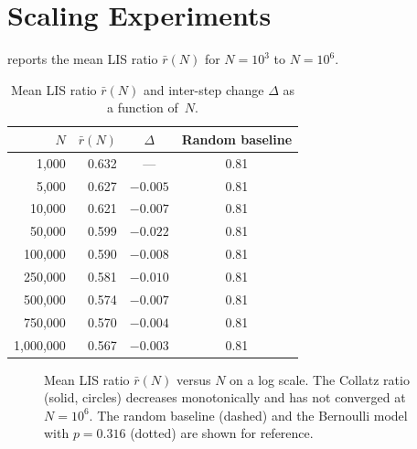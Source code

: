 \documentclass[11pt]{article}
\theoremstyle{definition}
\theoremstyle{remark}
\begin{document}
\section{Scaling Experiments}\label{sec:scaling}

 reports the mean LIS ratio $\bar{r}(N)$ for
$N = 10^3$ to $N = 10^6$.

\begin{table}[ht]
\centering
\caption{Mean LIS ratio $\bar{r}(N)$ and inter-step change $\Delta$ as a
function of~$N$.}
\label{tab:scaling}
\begin{tabular}{@{}rrcc@{}}
\toprule
$N$ & $\bar{r}(N)$ & $\Delta$ & Random baseline \\
\midrule
1{,}000     & 0.632 & ---     & 0.81 \\
5{,}000     & 0.627 & $-0.005$  & 0.81 \\
10{,}000    & 0.621 & $-0.007$  & 0.81 \\
50{,}000    & 0.599 & $-0.022$  & 0.81 \\
100{,}000   & 0.590 & $-0.008$  & 0.81 \\
250{,}000   & 0.581 & $-0.010$  & 0.81 \\
500{,}000   & 0.574 & $-0.007$  & 0.81 \\
750{,}000   & 0.570 & $-0.004$  & 0.81 \\
1{,}000{,}000 & 0.567 & $-0.003$  & 0.81 \\
\bottomrule
\end{tabular}
\end{table}

\begin{figure}[ht]
\centering
{}
\caption{Mean LIS ratio $\bar{r}(N)$ versus $N$ on a log scale. The
Collatz ratio (solid, circles) decreases monotonically and has not
converged at $N = 10^6$. The random baseline (dashed) and the Bernoulli
model with $p = 0.316$ (dotted) are shown for reference.}
\label{fig:scaling}
\end{figure}
\end{document}
